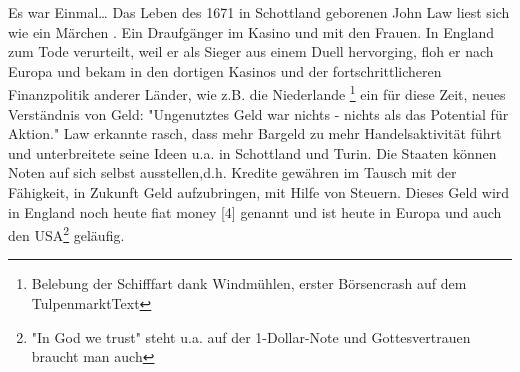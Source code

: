 \documentclass[
        onecolumn,
        a4paper,
        abstracton,
        parskip=half
        ,final
        ]{scrartcl}
\begin{document}
    Es war Einmal\ldots
    Das Leben des 1671 in Schottland geborenen John Law liest sich wie ein M{\"a}rchen \citep[vgl.][Kap. 2]{strathern2006schumpeters}. Ein Draufg{\"a}nger im Kasino und mit den Frauen. In England zum Tode verurteilt, weil er als Sieger aus einem Duell hervorging, floh er nach Europa und bekam in den dortigen Kasinos und der fortschrittlicheren Finanzpolitik anderer L{\"a}nder, wie z.B. die Niederlande \footnote[2]{Belebung der Schifffart dank Windm{\"u}hlen, erster B{\"o}rsencrash auf dem TulpenmarktText} ein f{\"u}r diese Zeit, neues Verst{\"a}ndnis von Geld: "Ungenutztes Geld war nichts - nichts als das Potential f{\"u}r Aktion." \citep[vgl.][Kap. 2]{strathern2006schumpeters}Law erkannte rasch, dass mehr Bargeld zu mehr Handelsaktivit{\"a}t f{\"u}hrt und unterbreitete seine Ideen u.a. in Schottland und Turin. Die Staaten k{\"o}nnen Noten auf sich selbst ausstellen,d.h. Kredite gew{\"a}hren im Tausch mit der F{\"a}higkeit, in Zukunft Geld aufzubringen, mit Hilfe von Steuern. Dieses Geld wird in England noch heute fiat money [4] genannt und ist heute in Europa und auch den USA\footnote[5]{"In God we trust" steht u.a. auf der 1-Dollar-Note und Gottesvertrauen braucht man auch} gel{\"a}ufig.
\end{document}
